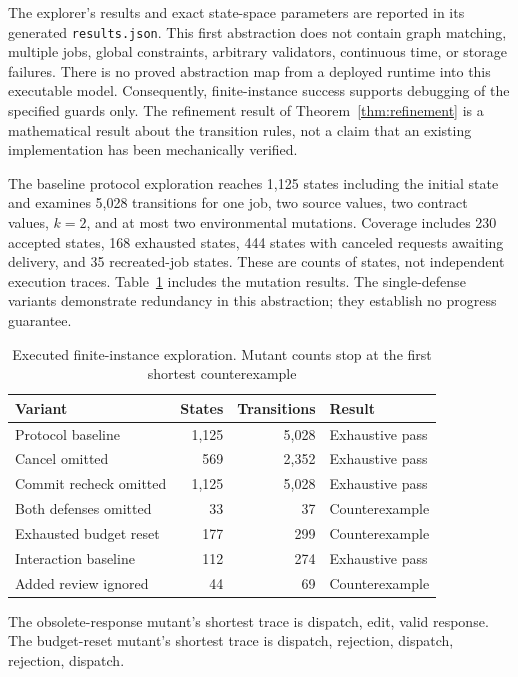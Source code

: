 \documentclass[pdflatex,sn-mathphys-num]{sn-jnl}
\theoremstyle{thmstyleone}
\theoremstyle{thmstylethree}
\theoremstyle{thmstyletwo}
\begin{document}
The explorer's results and exact state-space parameters are reported in its generated \texttt{results.json}. This first abstraction does not contain graph matching, multiple jobs, global constraints, arbitrary validators, continuous time, or storage failures. There is no proved abstraction map from a deployed runtime into this executable model. Consequently, finite-instance success supports debugging of the specified guards only. The refinement result of Theorem~\ref{thm:refinement} is a mathematical result about the transition rules, not a claim that an existing implementation has been mechanically verified.

The baseline protocol exploration reaches 1,125 states including the initial state and examines 5,028 transitions for one job, two source values, two contract values, $k=2$, and at most two environmental mutations. Coverage includes 230 accepted states, 168 exhausted states, 444 states with canceled requests awaiting delivery, and 35 recreated-job states. These are counts of states, not independent execution traces. Table~\ref{tab:exploration} includes the mutation results. The single-defense variants demonstrate redundancy in this abstraction; they establish no progress guarantee.
\begin{table}[tb]
\caption{Executed finite-instance exploration. Mutant counts stop at the first shortest counterexample}\label{tab:exploration}
\small\begin{tabularx}{\linewidth}{@{}Xrrl@{}}\toprule
Variant & States & Transitions & Result\\\midrule
Protocol baseline & 1,125 & 5,028 & Exhaustive pass\\
Cancel omitted & 569 & 2,352 & Exhaustive pass\\
Commit recheck omitted & 1,125 & 5,028 & Exhaustive pass\\
Both defenses omitted & 33 & 37 & Counterexample\\
Exhausted budget reset & 177 & 299 & Counterexample\\
Interaction baseline & 112 & 274 & Exhaustive pass\\
Added review ignored & 44 & 69 & Counterexample\\\bottomrule
\end{tabularx}
\end{table}

The obsolete-response mutant's shortest trace is dispatch, edit, valid response. The budget-reset mutant's shortest trace is dispatch, rejection, dispatch, rejection, dispatch. 
\end{document}
